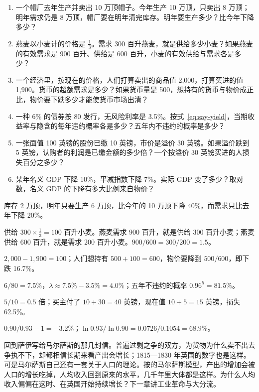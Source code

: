 \begin{selfcheck}
\begin{enumerate}
\item 一个帽厂去年生产并卖出 10 万顶帽子。今年生产 10 万顶，只卖出 8 万顶；明年需求仍是 8 万顶，帽厂要在明年清完库存。明年要生产多少？比今年下降多少？
\item 燕麦以小麦计的价格是 $\tfrac13$。需求 300 百升燕麦，就是供给多少小麦？如果燕麦的有效需求是 900 百升、供给是 600 百升，小麦的有效供给与需求各是多少？
\item 一个经济里，按现在的价格，人们打算卖出的商品值 2,000，打算买进的值 1,900。货币的超额需求是多少？如果货币量是 500，想持有的货币与物价成正比，物价要下跌多少才能使货币市场出清？
\item 一种 6\% 的债券按 80 发行，无风险利率是 3.5\%。按式~\eqref{eq:say-yield}，当期收益率与隐含的每年违约概率各是多少？五年内不违约的概率是多少？
\item 一张面值 100 英镑的股份已缴 10 英镑，市价是溢价 30 英镑。如果溢价跌到 5 英镑，认购者的利润是已缴金额的多少倍？一个按溢价 30 英镑买进的人损失百分之多少？
\item 某年名义 GDP 下降 10\%，平减指数下降 7\%。实际 GDP 变了多少？取对数，名义 GDP 的下降有多大比例来自物价？
\end{enumerate}
\end{selfcheck}

\begin{answers}
\item 库存 2 万顶，明年只要生产 6 万顶，比今年的 10 万顶下降 40\%，而需求只比去年下降 20\%。
\item 供给 $300\times\tfrac13=100$ 百升小麦。燕麦需求 900 百升，就是供给 300 百升小麦；燕麦供给 600 百升，就是需求 200 百升小麦。$900/600=300/200=1.5$。
\item $2{,}000-1{,}900=100$；人们想持有 $500+100=600$，物价要降到 $500/600$，即下跌 16.7\%。
\item $6/80=7.5\%$，$\lambda\approx7.5\%-3.5\%=4.0\%$；五年不违约的概率 $0.96^{5}=81.5\%$。
\item $5/10=0.5$ 倍；买主付了 $10+30=40$ 英镑，现在值 $10+5=15$ 英镑，损失 62.5\%。
\item $0.90/0.93-1=-3.2\%$；$\ln0.93/\ln0.90=0.0726/0.1054=68.9\%$。
\end{answers}

回到萨伊写给马尔萨斯的那几封信。普遍过剩之争的双方，为货物为什么卖不出去争执不下，却都相信长期来看产出会增长；1815—1830 年英国的数字也是这样。可是马尔萨斯自己还有一套关于人口的理论。按的马尔萨斯模型，产出的增加会被人口的增长吃掉，人均收入回到原来的水平，几千年里大体都是这样。为什么人均收入偏偏在这时、在英国开始持续增长？下一章讲工业革命与大分流。
